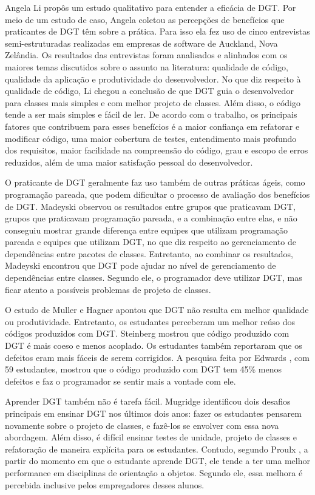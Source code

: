 Angela Li \cite{angela-li} propôs um estudo qualitativo para
entender a eficácia de DGT. Por meio de um estudo de caso, Angela coletou as 
percepções de benefícios que praticantes de DGT têm sobre a prática. Para isso ela
fez uso de cinco entrevistas semi-estruturadas realizadas em empresas de software de 
Auckland, Nova Zelândia. Os resultados das entrevistas foram analisados e alinhados
com os maiores temas discutidos sobre o assunto na literatura: qualidade de código,
qualidade da aplicação e produtividade do desenvolvedor.
No que diz respeito à qualidade de código, Li chegou a conclusão de
que DGT guia o desenvolvedor para classes mais simples e com melhor projeto de classes. 
Além disso, o código tende a ser mais simples e fácil de ler.
De acordo com o trabalho, os principais fatores que contribuem para esses benefícios
é a maior confiança em refatorar e modificar código, uma maior cobertura de testes,
entendimento mais profundo dos requisitos, maior facilidade na compreensão do código,
grau e escopo de erros reduzidos, além de uma maior satisfação pessoal do desenvolvedor.

O praticante de DGT geralmente faz uso também de outras práticas ágeis, como
programação pareada, que podem dificultar o processo de avaliação dos benefícios
de DGT. Madeyski \cite{madeyski-package-dependencies} observou os resultados
entre grupos que praticavam DGT, grupos que praticavam programação pareada, 
e a combinação entre elas,
e não conseguiu mostrar grande diferença entre equipes que utilizam programação 
pareada e equipes que utilizam DGT, no que diz respeito ao gerenciamento de dependências entre 
pacotes de classes. Entretanto, ao combinar os resultados, Madeyski encontrou que DGT pode 
ajudar no nível de gerenciamento de dependências entre classes. Segundo ele, o 
programador deve utilizar DGT, mas ficar atento a possíveis problemas de projeto de classes.

O estudo de Muller e Hagner \cite{muller-e-hagner} apontou que DGT não resulta
em melhor qualidade ou produtividade. Entretanto, os estudantes perceberam um 
melhor reúso dos códigos produzidos com DGT. Steinberg \cite{steinberg} mostrou
que código produzido com DGT é mais coeso e menos acoplado. Os estudantes também
reportaram que os defeitos eram mais fáceis de serem corrigidos. A pesquisa feita
por Edwards \cite{edwards}, com 59 estudantes, mostrou que o código produzido com
DGT tem 45\% menos defeitos e faz o programador se sentir mais a vontade
com ele.

Aprender DGT também não é tarefa fácil. Mugridge \cite{mugridge} identificou
dois desafios principais em ensinar DGT nos últimos dois anos: fazer os estudantes
pensarem novamente sobre o projeto de classes, e fazê-los se envolver com essa nova
abordagem. Além disso, é difícil ensinar testes de unidade, projeto de classes e refatoração
de maneira explícita para os estudantes. Contudo, segundo Proulx \cite{proulx}, a partir do momento em que
o estudante aprende DGT, ele tende a ter uma melhor performance em disciplinas
de orientação a objetos. Segundo ele, essa melhora é percebida inclusive pelos
empregadores desses alunos. 

